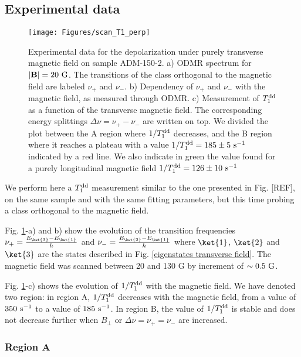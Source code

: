 \documentclass[a4paper,11pt]{report}
\begin{document}
\subsection{Experimental data}

\begin{figure}[h!]
\centering
\texttt{[image: Figures/scan\_T1\_perp]}
\caption{Experimental data for the depolarization under purely transverse magnetic field on sample ADM-150-2. a) ODMR spectrum for $|\mathbf{B}|=20\ \rm G$. The transitions of the class orthogonal to the magnetic field are labeled $\nu_+$ and $\nu_-$. b) Dependency of $\nu_+$ and $\nu_-$ with the magnetic field, as measured through ODMR. c) Measurement of $T_1^{\rm dd}$ as a function of the transverse magnetic field. The corresponding energy splittings $\Delta \nu=\nu_+-\nu_-$ are written on top. We divided the plot between the A region where $1/T_1^{\rm dd}$ decreases, and the B region where it reaches a plateau with a value $1/T_1^{\rm dd}=185 \pm 5\ \rm s^{-1}$ indicated by a red line. We also indicate in green the value found for a purely longitudinal magnetic field $1/T_1^{\rm dd}=126 \pm 10\ \rm s^{-1}$}
\label{champ tranverse exp}
\end{figure}

We perform here a $T_1^{\rm dd}$ measurement similar to the one presented in Fig. [REF], on the same sample and with the same fitting parameters, but this time probing a class orthogonal to the magnetic field.

Fig. \ref{champ tranverse exp}-a) and b) show the evolution of the transition frequencies $\nu_+=\frac{E_{\ket{3}}-E_{\ket{1}}}{h}$ and $\nu_-=\frac{E_{\ket{2}}-E_{\ket{1}}}{h}$ where $\ket{1}$, $\ket{2}$ and $\ket{3}$ are the states described in Fig. \ref{eigenstates transverse field}. The magnetic field was scanned between 20 and 130 G by increment of $\sim 0.5\ \rm G$.

Fig. \ref{champ tranverse exp}-c) shows the evolution of $1/T_1^{\rm dd}$ with the magnetic field. We have denoted two region: in region A, $1/T_1^{\rm dd}$ decreases with the magnetic field, from a value of $350\ \rm s^{-1}$ to a value of $185\ \rm s^{-1}$. In region B, the value of $1/T_1^{\rm dd}$ is stable and does not decrease further when $B_\perp$ or $\Delta \nu=\nu_+=\nu_-$ are increased.

\subsubsection{Region A}
\end{document}
